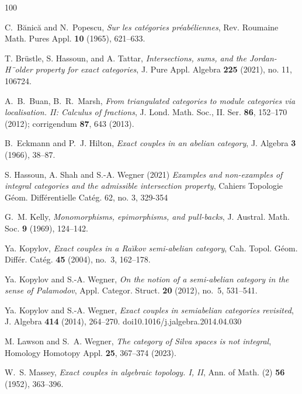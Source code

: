 \documentclass[a4paper,10pt,reqno]{amsart}
\begin{document}
	
	
	\begin{thebibliography}{100}
		
		C.~B\u anic\u a and N.~Popescu, \emph{Sur les cat\'egories pr\'eab\'eliennes},
		Rev. Roumaine Math. Pures Appl. \textbf{10} (1965), 621--633.
		
		T. Br\"{u}stle, S. Hassoun, and A. Tattar, \emph{Intersections, sums, and the Jordan-H¨older property for exact categories}, J.
		Pure Appl. Algebra \textbf{225} (2021), no. 11, 106724.
		
		A.~B.~Buan, B.~R.~Marsh, 
		\emph{From triangulated categories to module categories via localisation. II: Calculus of fractions}, 
		J. Lond. Math. Soc., II. Ser. \textbf{86}, 152--170 (2012); corrigendum \textbf{87}, 643 (2013).
		
		B.~Eckmann and P.~J. Hilton, \emph{Exact couples in an abelian category}, J.
		Algebra \textbf{3} (1966), 38--87.
		
		S. Hassoun, A. Shah and S.-A. Wegner (2021)
		\emph{Examples and non-examples of integral categories and the admissible intersection property},
		Cahiers Topologie Géom. Différentielle Catég. 62, no. 3, 329-354
		
		G.~M. Kelly, \emph{Monomorphisms, epimorphisms, and pull-backs}, J. Austral.
		Math. Soc. \textbf{9} (1969), 124--142.
		
		Ya. Kopylov, \emph{Exact couples in a {R}a\u{\i}kov semi-abelian category},
		Cah. Topol. G\'eom. Diff\'er. Cat\'eg. \textbf{45} (2004), no.~3, 162--178.
		
		Ya. Kopylov and S.-A. Wegner, \emph{On the notion of a semi-abelian category in
			the sense of {P}alamodov}, Appl. Categor. Struct. \textbf{20} (2012), no.~5,
		531--541.
		
		Ya. Kopylov and S.-A. Wegner, \emph{Exact couples in semiabelian categories revisited}, J. Algebra \textbf{414} (2014), 264--270. doi{10.1016/j.jalgebra.2014.04.030}
		
		M. Lawson and S.~A. Wegner, 
		\emph{The category of Silva spaces is not integral}, 
		Homology Homotopy Appl. \textbf{25}, 367--374 (2023).
		
		W.~S. Massey, \emph{Exact couples in algebraic topology. {I}, {II}}, Ann. of
		Math. (2) \textbf{56} (1952), 363--396.
		

\end{thebibliography}
\end{document}
